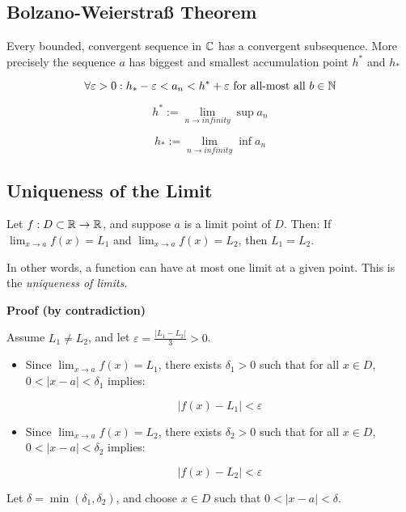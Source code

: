 \subsection{Bolzano-Weierstraß Theorem}

Every bounded, convergent sequence in \(\mathbb{C}\) has a convergent subsequence.
More precisely the sequence \(a\) has biggest and smallest accumulation point \(h^*\) and \(h_*\)

\[
    \forall \varepsilon > 0 : h_* - \varepsilon < a_n < h^{*} + \varepsilon \text{ for all-most all } 
    b \in \mathbb{N}
\]

\[
    h^* := \lim_{n \to infinity} \sup a_n
\]

\[
    h_* := \lim_{n \to infinity} \inf a_n
\]

\subsection{Uniqueness of the Limit}

Let \( f: D \subset \mathbb{R} \to \mathbb{R} \), and suppose \(a\) is a limit point of \( D \). Then:
If \( \lim_{x \to a} f(x) = L_1 \) and \( \lim_{x \to a} f(x) = L_2 \), then \( L_1 = L_2 \).
\vspace{\baselineskip}

In other words, a function can have at most one limit at a given point. This is the \emph{uniqueness of limits}.

\textbf{Proof (by contradiction)}

Assume \( L_1 \ne L_2 \), and let \( \varepsilon = \frac{|L_1 - L_2|}{3} > 0 \).

\begin{itemize}

    \item Since \( \lim_{x \to a} f(x) = L_1 \), there exists \( \delta_1 > 0 \) such that for all \( x \in D \), \( 0 < |x - a| < \delta_1 \) implies:

    \[
        |f(x) - L_1| < \varepsilon
    \]
    
    \item Since \( \lim_{x \to a} f(x) = L_2 \), there exists \( \delta_2 > 0 \) such that for all \( x \in D \), \( 0 < |x - a| < \delta_2 \) implies:

    \[
        |f(x) - L_2| < \varepsilon
    \]

\end{itemize}

Let \( \delta = \min(\delta_1, \delta_2) \), and choose \( x \in D \) such that \( 0 < |x - a| < \delta \).

